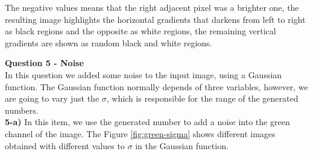 \documentclass[12pt,a4paper]{article}
\begin{document}
The negative values means that the right adjacent pixel was a brighter one, the resulting image highlights the horizontal gradients that darkens from left to right as black regions and the opposite as white regions, the remaining vertical gradients are shown as random black and white regions.

\newpage

\textbf{Question 5 - Noise} \\

In this question we added some noise to the input image, using a Gaussian function. The Gaussian function normally depends of three variables, however, we are going to vary just the $\sigma$, which is responsible for the range of the generated numbers. \\

\textbf{5-a) }  In this item, we use the generated number to add a noise into the green channel of the image. The Figure \ref{fig:green-sigma} shows different images obtained with different values to $\sigma$ in the Gaussian function. \\
\end{document}
